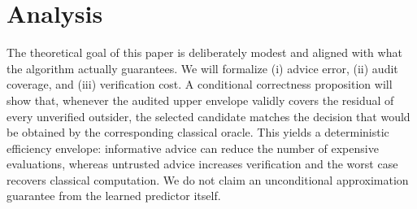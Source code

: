 \section{Analysis}
\label{sec:analysis}

The theoretical goal of this paper is deliberately modest and aligned with what the algorithm actually guarantees. We will formalize (i) advice error, (ii) audit coverage, and (iii) verification cost. A conditional correctness proposition will show that, whenever the audited upper envelope validly covers the residual of every unverified outsider, the selected candidate matches the decision that would be obtained by the corresponding classical oracle. This yields a deterministic efficiency envelope: informative advice can reduce the number of expensive evaluations, whereas untrusted advice increases verification and the worst case recovers classical computation. We do not claim an unconditional approximation guarantee from the learned predictor itself.
